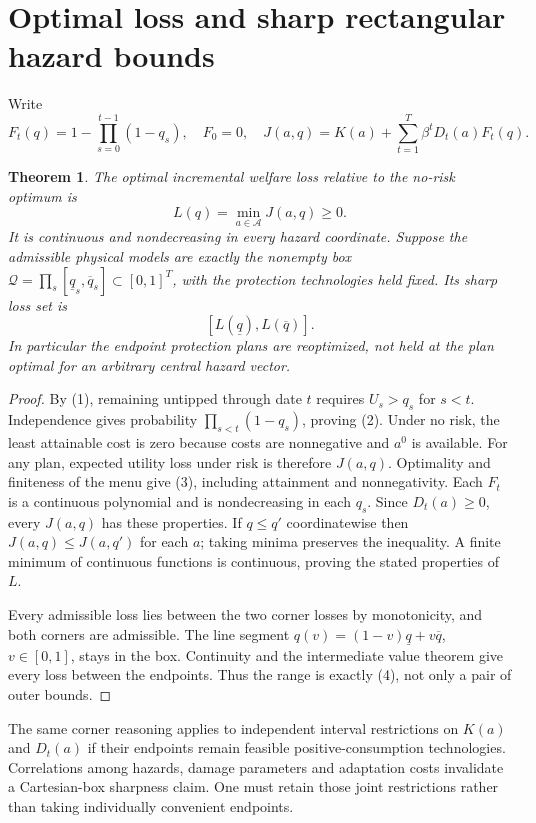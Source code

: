 \documentclass[11pt]{article}
\newtheorem{theorem}{Theorem}
\begin{document}
\section{Optimal loss and sharp rectangular hazard bounds}
Write
\[
 F_t(q)=1-\prod_{s=0}^{t-1}(1-q_s),\quad F_0=0,
 \quad J(a,q)=K(a)+\sum_{t=1}^T\beta^tD_t(a)F_t(q).             \tag{2}
\]
\begin{theorem}\label{loss}
The optimal incremental welfare loss relative to the no-risk optimum is
\[
 L(q)=\min_{a\in\mathcal A}J(a,q)\geq0.                       \tag{3}
\]
It is continuous and nondecreasing in every hazard coordinate. Suppose
the admissible physical models are exactly the nonempty box
$\mathcal Q=\prod_s[\underline q_s,\overline q_s]\subset[0,1]^T$,
with the protection technologies held fixed. Its sharp loss set is
\[
 [L(\underline q),L(\overline q)].                            \tag{4}
\]
In particular the endpoint protection plans are reoptimized, not held
at the plan optimal for an arbitrary central hazard vector.
\end{theorem}
\begin{proof}
By (1), remaining untipped through date $t$ requires
$U_s>q_s$ for $s<t$. Independence gives probability
$\prod_{s<t}(1-q_s)$, proving (2). Under no risk, the least attainable
cost is zero because costs are nonnegative and $a^0$ is available.
For any plan, expected utility loss under risk is therefore $J(a,q)$.
Optimality and finiteness of the menu give (3), including attainment and
nonnegativity. Each $F_t$ is a continuous polynomial and is nondecreasing
in each $q_s$. Since $D_t(a)\geq0$, every $J(a,q)$ has these properties.
If $q\leq q'$ coordinatewise then $J(a,q)\leq J(a,q')$ for each $a$;
taking minima preserves the inequality. A finite minimum of continuous
functions is continuous, proving the stated properties of $L$.

Every admissible loss lies between the two corner losses by monotonicity,
and both corners are admissible. The line segment
$q(v)=(1-v)\underline q+v\overline q$, $v\in[0,1]$, stays in the box.
Continuity and the intermediate value theorem give every loss between the
endpoints. Thus the range is exactly (4), not only a pair of outer bounds.
\end{proof}
The same corner reasoning applies to independent interval restrictions on
$K(a)$ and $D_t(a)$ if their endpoints remain feasible positive-consumption
technologies. Correlations among hazards, damage parameters and adaptation
costs invalidate a Cartesian-box sharpness claim. One must retain those
joint restrictions rather than taking individually convenient endpoints.
\end{document}
